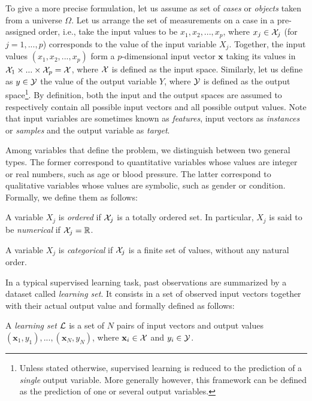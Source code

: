 To give a more precise formulation, let us assume as set of \textit{cases} or
\textit{objects} taken from a universe $\Omega$. Let us arrange the set of
measurements on a case in a pre-assigned order, i.e., take the input values to
be $x_1, x_2, ..., x_p$, where $x_j \in {\cal X}_j$ (for $j = 1, ..., p$)
corresponds to the value of the input variable $X_j$. Together, the input
values $(x_1, x_2, ..., x_p)$ form a $p$-dimensional input vector $\mathbf{x}$
taking its values in ${\cal X}_1 \times ... \times {\cal X}_p = {\cal X}$,
where ${\cal X}$ is defined as the input space. Similarly, let us define as $y
\in {\cal Y}$ the value of the output variable $Y$, where ${\cal Y}$ is defined
as the output space\footnote{Unless stated otherwise, supervised learning is
reduced to the prediction of a \textit{single} output variable. More generally
however, this framework can be defined as the prediction of one or several
output variables.}. By definition, both the input and the output spaces are
assumed to respectively contain all possible input vectors and all possible
output values. Note that input variables are sometimes known as {\it features},
input vectors as {\it instances} or {\it samples} and the output variable as
{\it target}.

Among variables that define the problem, we distinguish between two general
types. The former correspond to quantitative variables whose values are integer
or real numbers, such as age or blood pressure. The latter correspond to
qualitative variables whose values are symbolic, such as gender or condition.
Formally, we define them as follows:

\begin{definition}
A variable $X_j$ is \emph{ordered} if ${\cal X}_j$ is a
totally ordered set. In particular, $X_j$ is said to be \emph{numerical} if
${\cal X}_j = \mathbb{R}$.
\end{definition}

\begin{definition}
A variable $X_j$ is \emph{categorical} if ${\cal X}_j$ is a finite set of values,
without any natural order.
\end{definition}

In a typical supervised learning task, past observations are summarized by a
dataset called {\it learning set}. It consists in a set of observed input
vectors together with their actual output value and formally defined as
follows:

\begin{definition}
A \emph{learning set} ${\cal L}$ is a set of $N$
pairs of input vectors and output values $(\mathbf{x}_1, y_1), ...,
(\mathbf{x}_N, y_N)$, where $\mathbf{x}_i \in {\cal X}$ and $y_i \in {\cal Y}$.
\end{definition}

